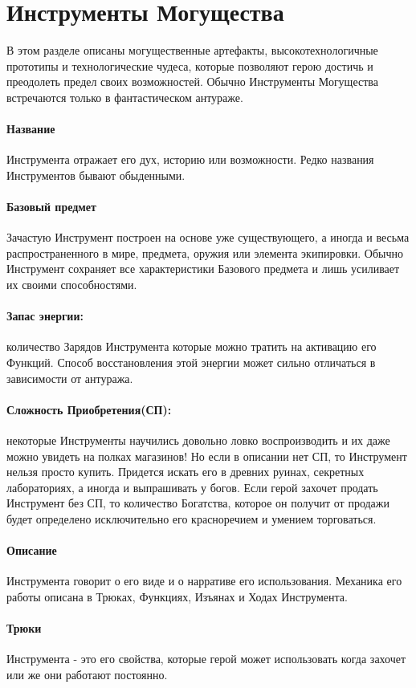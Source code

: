 \section{Инструменты Могущества \tbd}
В этом разделе описаны могущественные артефакты, высокотехнологичные прототипы и технологические чудеса, которые позволяют герою достичь и преодолеть предел своих возможностей. Обычно Инструменты Могущества встречаются только в фантастическом антураже.

\paragraph{Название} Инструмента отражает его дух, историю или возможности. Редко названия Инструментов бывают обыденными.
\paragraph{Базовый предмет} Зачастую Инструмент построен на основе уже существующего, а иногда и весьма распространенного в мире, предмета, оружия или элемента экипировки. Обычно Инструмент сохраняет все характеристики Базового предмета и лишь усиливает их своими способностями.
\paragraph{Запас энергии: } количество Зарядов Инструмента которые можно тратить на активацию его Функций. Способ восстановления этой энергии может сильно отличаться в зависимости от антуража.
\paragraph{Сложность Приобретения(СП): }некоторые Инструменты научились довольно ловко воспроизводить и их даже можно увидеть на полках магазинов! Но если в описании нет СП, то Инструмент нельзя просто купить. Придется искать его в древних руинах, секретных лабораториях, а иногда и выпрашивать у богов. Если герой захочет продать Инструмент без СП, то количество Богатства, которое он получит от продажи будет определено исключительно его красноречием и умением торговаться.
\paragraph{Описание }Инструмента говорит о его виде и о нарративе его использования. Механика его работы описана в Трюках, Функциях, Изъянах и Ходах Инструмента.
\paragraph{Трюки }Инструмента - это его свойства, которые герой может использовать когда захочет или же они работают постоянно.
